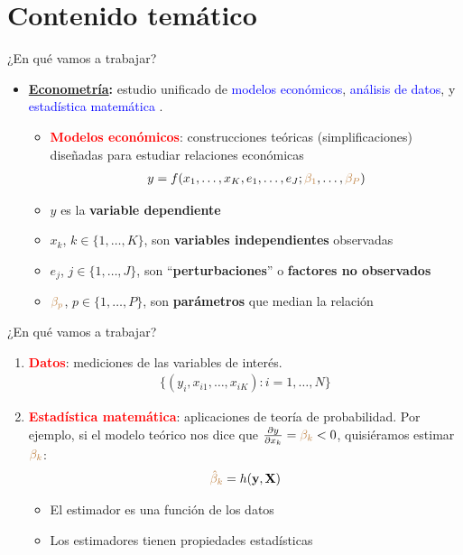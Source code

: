 \documentclass[10pt, xcolor=dvipsnames]{beamer}
\begin{document}
\section{Contenido temático}

\begin{frame}{¿En qué vamos a trabajar?}	
\begin{itemize}
	\item \textbf{\underline{Econometría}:} estudio unificado de \textcolor{blue}{modelos económicos}, \textcolor{blue}{análisis de datos}, y \textcolor{blue}{estadística matemática} \citep{Hanse2021}. \vspace{0.4cm}	\pause
\begin{itemize}
	\item[1.] \textcolor{red}{\textbf{Modelos económicos}}: construcciones teóricas (simplificaciones) diseñadas para estudiar relaciones económicas
\begin{align*}
y = f(x_1,\ldots,x_K,e_1,\ldots,e_J;\textcolor{brown}{\beta_1},\ldots,\textcolor{brown}{\beta_P})
\end{align*}\vspace{-0.4cm}
	\item $y$ es la \textbf{variable dependiente}
	\item $x_k$,  $k \in \{1,\ldots, K\}$, son \textbf{variables independientes} observadas 
	\item $e_j$, $j \in \{1,\ldots, J\}$, son ``\textbf{perturbaciones}'' o \textbf{factores no observados} 
	\item $\textcolor{brown}{\beta_p}$, $p \in \{1,\ldots, P\}$, son \textbf{parámetros} que median la relación
\end{itemize}	
\end{itemize}
\end{frame}

\begin{frame}{¿En qué vamos a trabajar?}	
\begin{enumerate}
	\item[2.] \textcolor{red}{\textbf{Datos}}: mediciones de las variables de interés.
\begin{align*}
\{(y_i,x_{i1},\ldots,x_{iK}): i = 1, \ldots, N\}
\end{align*}	
\pause
	\item[3.] \textcolor{red}{\textbf{Estadística matemática}}: aplicaciones de teoría de probabilidad. Por ejemplo, si el modelo teórico nos dice que $\frac{\partial y}{\partial x_k} = \textcolor{brown}{\beta_k}<0$, quisiéramos estimar $\textcolor{brown}{\beta_k}$:	 
	\begin{align*}
	\textcolor{brown}{\hat{\beta}_k} = h(\textbf{y},\textbf{X})
	\end{align*}
 \begin{itemize}
     \item El estimador es una función de los datos
     \item Los estimadores tienen propiedades estadísticas
 \end{itemize}
\end{enumerate}	
\end{frame}
\end{document}
